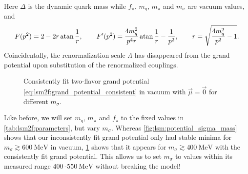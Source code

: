 Here $\Delta$ is the dynamic quark mass while $f_\pi$, $m_q$, $m_\pi$ and $m_\sigma$ are vacuum values, and
\begin{equation}
	F(p^2) = 2 - 2 r \operatorname{atan} \frac1r, \qquad
	F'(p^2) = \frac{4 m_q^2}{p^4 r} \operatorname{atan} \frac1r - \frac{1}{p^2}, \qquad
	r = \sqrt{\frac{4 m_q^2}{p^2}-1} .
\end{equation}
Coincidentally, the renormalization scale $\Lambda$ has disappeared from the grand potential upon substitution of the renormalized couplings.

\begin{figure}
\centering
{}
\caption{\label{fig:lsm:potential_sigma_mass_ref}
Consistently fit two-flavor grand potential \eqref{eq:lsm2f:grand_potential_consistent} in vacuum with $\vec{\mu}=\vec{0}$ for different $m_\sigma$.
}
\end{figure}

Like before, we will set $m_q$, $m_\pi$ and $f_\pi$ to the fixed values in \cref{tab:lsm2f:parameters}, but vary $m_\sigma$.
Whereas \cref{fig:lsm:potential_sigma_mass} shows that our inconsistently fit grand potential only had stable minima for $m_\sigma \gtrsim \SI{600}{\mega\electronvolt}$ in vacuum,
\cref{fig:lsm:potential_sigma_mass_ref} shows that it appears for $m_\sigma \gtrsim \SI{400}{\mega\electronvolt}$ with the consistently fit grand potential.
This allows us to set $m_\sigma$ to values within its measured range $\SI{400}{}$-$\SI{550}{\mega\electronvolt}$ without breaking the model!

